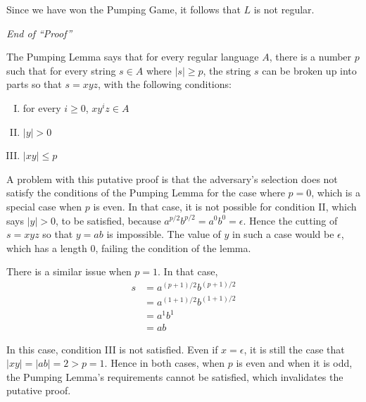 \documentclass[12pt,letterpaper,final]{report}
\begin{document}
Since we have won the Pumping Game, it follows that $L$ is not regular.

\emph{End of ``Proof''}

\medskip

The Pumping Lemma says that for every regular language $A$, there is a number $p$ such that for every string $s \in A$ where $\vert s \vert \ge p$, the string $s$ can be broken up into parts so that $s = xyz$, with the following conditions:
\begin{enumerate}[I.]
  \item for every $i \ge 0$, $xy^iz \in A$
  \item $\vert y \vert > 0$
  \item $\vert xy \vert \le p$
\end{enumerate}

A problem with this putative proof is that the adversary's selection does not satisfy the conditions of the Pumping Lemma for the case where $p = 0$, which is a special case when $p$ is even. In that case, it is not possible for condition II, which says $\vert y \vert > 0$, to be satisfied, because $a^{p/2}b^{p/2} = a^0b^0 = \epsilon$. Hence the cutting of $s = xyz$ so that $y = ab$ is impossible. The value of $y$ in such a case would be $\epsilon$, which has a length $0$, failing the condition of the lemma.

There is a similar issue when $p = 1$. In that case,
\begin{align*}
  s & = a^{(p+1)/2} b^{(p+1)/2} \\
    & = a^{(1+1)/2} b^{(1+1)/2} \\
    & = a^{1} b^{1} \\
    & = ab
\end{align*}

In this case, condition III is not satisfied. Even if $x = \epsilon$, it is still the case that $\vert xy \vert = \vert ab \vert = 2 > p = 1$. Hence in both cases, when $p$ is even and when it is odd, the Pumping Lemma's requirements cannot be satisfied, which invalidates the putative proof.
\end{document}
